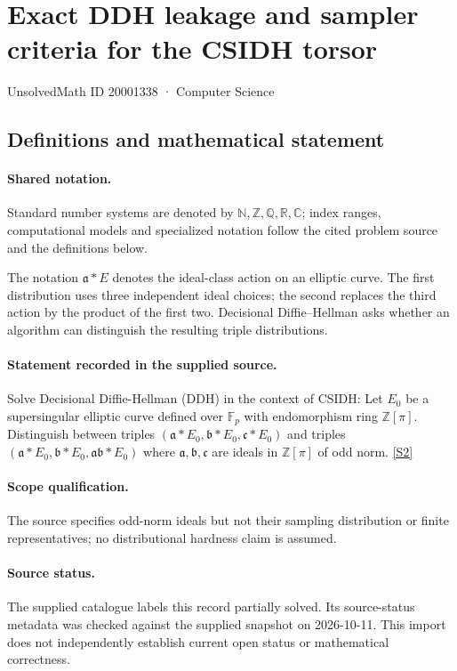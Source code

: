 \documentclass[11pt]{article}
\newcommand{\sref}[2]{\hyperlink{source:#1:#2}{[S#2]}}
\begin{document}
\setcounter{section}{20001337}
\section{Exact DDH leakage and sampler criteria for the CSIDH torsor}\label{20001338}
{\small\sffamily UnsolvedMath ID 20001338 · Computer Science}
\subsection{Definitions and mathematical statement}

\paragraph{Shared notation.}Standard number systems are denoted by $\mathbb N,\mathbb Z,\mathbb Q,\mathbb R,\mathbb C$; index ranges, computational models and specialized notation follow the cited problem source and the definitions below.


The notation $\mathfrak a*E$ denotes the ideal-class action on an elliptic curve. The first distribution uses three independent ideal choices; the second replaces the third action by the product of the first two. Decisional Diffie--Hellman asks whether an algorithm can distinguish the resulting triple distributions.
\paragraph{Statement recorded in the supplied source.}
Solve Decisional Diffie-Hellman (DDH) in the context of CSIDH: Let $E_0$ be a supersingular elliptic curve defined over $\mathbb F_p$ with endomorphism ring $\mathbb Z[\pi]$. Distinguish between triples $(\mathfrak a * E_0, \mathfrak b* E_0,\mathfrak c* E_0)$ and triples $(\mathfrak a * E_0, \mathfrak b* E_0,\mathfrak a\mathfrak b * E_0)$ where $\mathfrak a, \mathfrak b, \mathfrak c$ are ideals in $\mathbb Z[\pi]$ of odd norm. \sref{20001338}{2}
\paragraph{Scope qualification.}
The source specifies odd-norm ideals but not their sampling distribution or finite representatives; no distributional hardness claim is assumed.
\paragraph{Source status.}
The supplied catalogue labels this record partially solved. Its source-status metadata was checked against the supplied snapshot on 2026-10-11. This import does not independently establish current open status or mathematical correctness.
\end{document}
